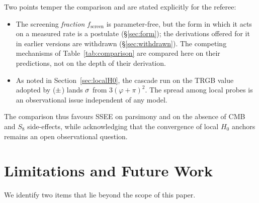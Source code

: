 \documentclass[12pt,a4paper]{article}
\newcommand{\phiG}{\varphi}
\newcommand{\fsc}{f_{\mathrm{screen}}}
\begin{document}
Two points temper the comparison and are stated explicitly for the referee:
\begin{itemize}[itemsep=2pt]
  \item The screening \emph{fraction} $\fsc$ is parameter-free, but the form
        in which it acts on a measured rate is a postulate
        (§\ref{sec:form}); the derivations offered for it in earlier versions
        are withdrawn (§\ref{sec:withdrawn}). The competing mechanisms of
        Table~\ref{tab:comparison} are compared here on their predictions, not
        on the depth of their derivation.
  \item As noted in Section~\ref{sec:localH0}, the cascade run on the TRGB
        value adopted by \citet{Freedman2024}
        ($\val{p9_cchp_H0}\pm\val{p9_cchp_H0_s}$) lands
        $\val{p9_cchp_sig_IR}\sigma$ from $3(\phiG+\pi)^2$. The spread among
        local probes is an observational issue independent of any model.
\end{itemize}
The comparison thus favours SSEE on parsimony and on the absence of CMB and
$S_8$ side-effects, while acknowledging that the convergence of local $H_0$
anchors remains an open observational question.

\section{Limitations and Future Work}
\label{sec:limitations}

We identify two items that lie beyond the scope of this paper.
\end{document}
